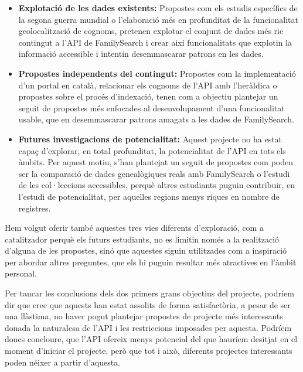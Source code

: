    \begin{itemize}
        \item \textbf{Explotació de les dades existents:} Propostes com els estudis específics de la segona guerra mundial o l’elaboració més en profunditat de la funcionalitat geolocalització de cognoms, pretenen explotar el conjunt de dades més ric contingut a l’API de FamilySearch i crear així funcionalitats que explotin la informació accessible i intentin desemmascarar patrons en les dades.
        \item \textbf{Propostes independents del contingut:} Propostes com la implementació d’un portal en català, relacionar els cognoms de l’API amb l’heràldica o propostes sobre el procés d’indexació, tenen com a objectiu plantejar un seguit de propostes més enfocades al desenvolupament d’una funcionalitat usable, que en desemmascarar patrons amagats a les dades de FamilySearch.
        \item \textbf{Futures investigacions de potencialitat:} Aquest projecte no ha estat capaç d’explorar, en total profunditat, la potencialitat de l’API en tots els àmbits. Per aquest motiu, s’han plantejat un seguit de propostes com poden ser la comparació de dades genealògiques reals amb FamilySearch o l’estudi de les col·leccions accessibles, perquè altres estudiants puguin contribuir, en l’estudi de potencialitat, per aquelles regions menys riques en nombre de registres.
    \end{itemize}

    Hem volgut oferir també aquestes tres vies diferents d’exploració, com a catalitzador perquè els futurs estudiants, no es limitin només a la realització d’alguna de les propostes, sinó que aquestes siguin utilitzades com a inspiració per abordar altres preguntes, que els hi puguin resultar més atractives en l’àmbit personal.

    Per tancar les conclusions dels dos primers grans objectius del projecte, podríem dir que crec que aquests han estat assolits de forma satisfactòria, a pesar de ser una llàstima, no haver pogut plantejar propostes de projecte més interessants donada la naturalesa de l’API i les restriccions imposades per aquesta. Podríem doncs concloure, que l’API ofereix menys potencial del que hauríem desitjat en el moment d’iniciar el projecte, però que tot i això, diferents projectes interessants poden néixer a partir d’aquesta.
